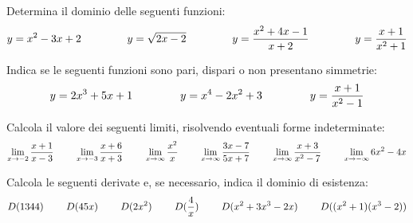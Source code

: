 \documentclass[addpoints]{exam}
\begin{document}
 
\begin{center}
\end{center} 
 
\vspace{5mm}
 
 
\vspace{5mm}
 

\begin{questions}
	\question[2 \half] Determina il dominio delle seguenti funzioni:
	\begin{align*}
	y=x^2-3x+2 \hspace{15mm} 
	y=\sqrt{2x-2} \hspace{15mm}
	y=\frac{x^2+4x-1}{x+2} \hspace{15mm}
	y=\frac{x+1}{x^2+1}
	\end{align*}
	
	\question[2 \half] Indica se le seguenti funzioni sono pari, dispari o non presentano simmetrie:
	\begin{align*}
	y=2x^3+5x+1 \hspace{15mm}
	y=x^4-2x^2+3 \hspace{15mm}
	y=\frac{x+1}{x^2-1}
	\end{align*}
	
	\question[2 \half] Calcola il valore dei seguenti limiti, risolvendo eventuali forme indeterminate:
	\begin{align*}
	\lim_{x \to -2} \frac{x+1}{x-3} \hspace{8mm}
	\lim_{x \to -3} \frac{x+6}{x+3} \hspace{8mm}
	\lim_{x \to \infty} \frac{x^2}{x} \hspace{8mm}
	\lim_{x \to \infty} \frac{3x-7}{5x+7} \hspace{8mm}
	\lim_{x \to \infty} \frac{x+3}{x^2-7} \hspace{8mm}
	\lim_{x \to -\infty} 6x^2-4x
	\end{align*}
	
	\question[2 \half] Calcola le seguenti derivate e, se necessario, indica il dominio di esistenza:
	\begin{align*}
	D(1344) \hspace{8mm}
	D(45x) \hspace{8mm}
	D(2x^2) \hspace{8mm}
	D(\frac{4}{x}) \hspace{8mm}
	D(x^2+3x^3-2x) \hspace{8mm}
	D((x^2+1)(x^3-2))
	\end{align*}
\end{questions}

\begin{center}
	\gradetable[h][questions]
\end{center}
\end{document}
